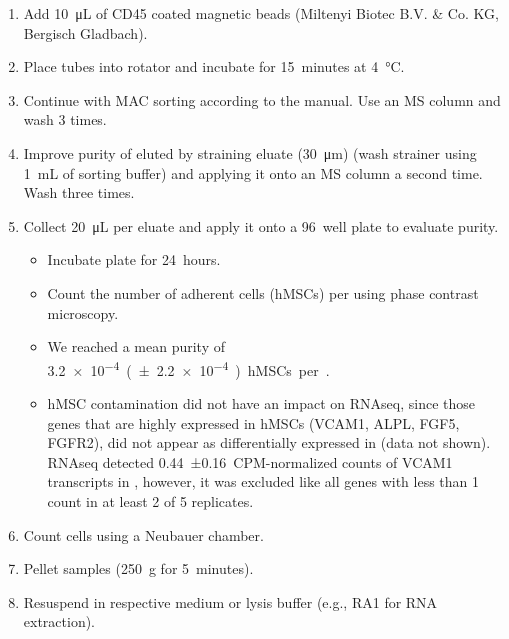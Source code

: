 \begin{itemize}
\begin{enumerate}
              \item Add \SI{10}{\micro\liter} of CD45 coated magnetic beads (Miltenyi Biotec B.V. \& Co. KG, Bergisch Gladbach).
              \item Place tubes into rotator and incubate for \SI{15}{minutes} at \SI{4}{\degreeCelsius}.
              \item Continue with MAC sorting according to the manual. Use an MS column and wash 3 times.
              \item Improve purity of eluted \MAina by straining eluate (\SI{30}{\micro\meter}) (wash strainer using \SI{1}{mL} of sorting buffer) and applying it onto an MS column a second time. Wash three times.
              \item Collect \SI{20}{\micro\liter} per eluate and apply it onto a \SI{96}{well} plate to evaluate purity.
                    \begin{itemize}
                        \item[a.] Incubate plate for \SI{24}{hours}.
                        \item[b.] Count the number of adherent cells (hMSCs) per \INA using phase contrast microscopy.
                        \item[c.] We reached a mean purity of \SI{3.2e-4} (±\SI{2.2e-4}) hMSCs per \MAina.
                        \item[d.] hMSC contamination did not have an impact on RNAseq, since those genes that are highly expressed in hMSCs (VCAM1, ALPL, FGF5, FGFR2), did not appear as differentially expressed in \MAina (data not shown). RNAseq detected 0.44~±0.16~{CPM-normalized} counts of VCAM1 transcripts in \MAina, however, it was excluded like all genes with less than 1 count in at least 2 of 5 replicates.
                    \end{itemize}
              \item Count cells using a Neubauer chamber.
              \item Pellet samples (\SI{250}{g} for \SI{5}{minutes}).
              \item Resuspend in respective medium or lysis buffer (e.g., RA1 for RNA extraction).
          \end{enumerate}


\end{itemize}
